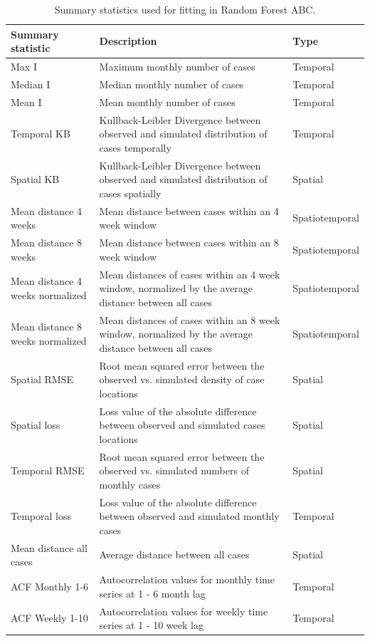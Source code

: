 \documentclass[
  oneside]{book}
\begin{document}
\begin{table}

\caption{\label{tab:tbsstats}Summary statistics used for fitting in Random Forest ABC.}
\centering
\begin{tabu} to 
\toprule
Summary statistic & Description & Type\\
\midrule
Max I & Maximum monthly number of cases & Temporal\\
Median I & Median monthly number of cases & Temporal\\
Mean I & Mean monthly number of cases & Temporal\\
Temporal KB & Kullback-Leibler Divergence between observed and simulated distribution of cases temporally & Temporal\\
Spatial KB & Kullback-Leibler Divergence between observed and simulated distribution of cases spatially & Spatial\\
\addlinespace
Mean distance 4 weeks & Mean distance between cases within an 4 week window & Spatiotemporal\\
Mean distance 8 weeks & Mean distance between cases within an 8 week window & Spatiotemporal\\
Mean distance 4 weeks normalized & Mean distances of cases within an 4 week window, normalized by the average distance between all cases & Spatiotemporal\\
Mean distance 8 weeks normalized & Mean distances of cases within an 8 week window, normalized by the average distance between all cases & Spatiotemporal\\
Spatial RMSE & Root mean squared error between the observed vs. simulated density of case locations & Spatial\\
\addlinespace
Spatial loss & Loss value of the absolute difference between observed and simulated cases locations & Spatial\\
Temporal RMSE & Root mean squared error between the observed vs. simulated numbers of monthly cases & Spatial\\
Temporal loss & Loss value of the absolute difference between observed and simulated monthly cases & Temporal\\
Mean distance all cases & Average distance between all cases & Spatial\\
ACF Monthly 1-6 & Autocorrelation values for monthly time series at 1 - 6 month lag & Temporal\\
\addlinespace
ACF Weekly 1-10 & Autocorrelation values for weekly time series at 1 - 10 week lag & Temporal\\
\bottomrule
\end{tabu}
\end{table}
\end{document}
